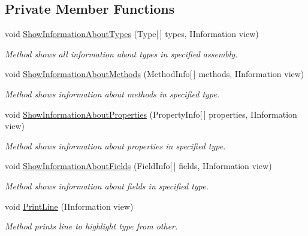 \subsection*{Private Member Functions}
\begin{DoxyCompactItemize}
\item 
void \mbox{\hyperlink{class_home_work_1_1_task_library_1_1_tasks_1_1_lesson12_1_1_task1_a26fbb78c701a3b7194b5be19d0be27c6}{Show\+Information\+About\+Types}} (Type\mbox{[}$\,$\mbox{]} types, I\+Information view)
\begin{DoxyCompactList}\small\item\em Method shows all information about types in specified assembly. \end{DoxyCompactList}\item 
void \mbox{\hyperlink{class_home_work_1_1_task_library_1_1_tasks_1_1_lesson12_1_1_task1_ae134abb25931e210bf52357ff95e2873}{Show\+Information\+About\+Methods}} (Method\+Info\mbox{[}$\,$\mbox{]} methods, I\+Information view)
\begin{DoxyCompactList}\small\item\em Method shows information about methods in specified type. \end{DoxyCompactList}\item 
void \mbox{\hyperlink{class_home_work_1_1_task_library_1_1_tasks_1_1_lesson12_1_1_task1_a42b8865479b5884a39b475b70ef74500}{Show\+Information\+About\+Properties}} (Property\+Info\mbox{[}$\,$\mbox{]} properties, I\+Information view)
\begin{DoxyCompactList}\small\item\em Method shows information about properties in specified type. \end{DoxyCompactList}\item 
void \mbox{\hyperlink{class_home_work_1_1_task_library_1_1_tasks_1_1_lesson12_1_1_task1_aac4982552cfe5b716785f4ba5dc158a1}{Show\+Information\+About\+Fields}} (Field\+Info\mbox{[}$\,$\mbox{]} fields, I\+Information view)
\begin{DoxyCompactList}\small\item\em Method shows information about fields in specified type. \end{DoxyCompactList}\item 
void \mbox{\hyperlink{class_home_work_1_1_task_library_1_1_tasks_1_1_lesson12_1_1_task1_aa09cdb0b453542f74db88b71dde67d4b}{Print\+Line}} (I\+Information view)
\begin{DoxyCompactList}\small\item\em Method prints line to highlight type from other. \end{DoxyCompactList}\end{DoxyCompactItemize}


